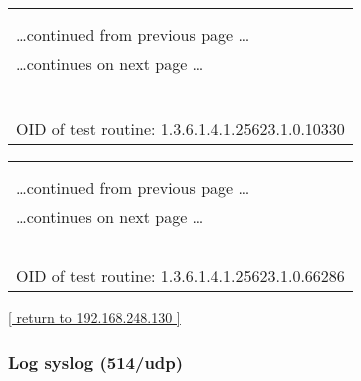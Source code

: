 \documentclass{article}
\begin{document}
\begin{longtable}{|p{}|}
\hline
\rowcolor{openvas_log}{\color{white}{Log (CVSS: 0.0) }}\\
\rowcolor{openvas_log}{\color{white}{NVT: Services}}\\
\hline
\endfirsthead
\hfill\ldots continued from previous page \ldots \\
\hline
\endhead
\hline
\ldots continues on next page \ldots \\
\endfoot
\hline
\endlastfoot
\\
\rowcolor{white}{\verb=An unknown service is running on this port.=}\\
\rowcolor{white}{\verb=It is usually reserved for AUTH=}\\
\rowcolor{white}{\verb==}\\
\rowcolor{white}{\verb==}\\
\\
OID of test routine: 1.3.6.1.4.1.25623.1.0.10330\\
\end{longtable}

\begin{longtable}{|p{}|}
\hline
\rowcolor{openvas_log}{\color{white}{Log (CVSS: 0.0) }}\\
\rowcolor{openvas_log}{\color{white}{NVT: Identify unknown services with nmap}}\\
\hline
\endfirsthead
\hfill\ldots continued from previous page \ldots \\
\hline
\endhead
\hline
\ldots continues on next page \ldots \\
\endfoot
\hline
\endlastfoot
\\
\rowcolor{white}{\verb=Nmap service detection result for this port: ident=}\\
\rowcolor{white}{\verb==}\\
\rowcolor{white}{\verb==}\\
\\
OID of test routine: 1.3.6.1.4.1.25623.1.0.66286\\
\end{longtable}

\begin{footnotesize}\hyperref[host:192.168.248.130]{[ return to 192.168.248.130 ]}\end{footnotesize}
\subsubsection{Log syslog (514/udp)}
\label{port:192.168.248.130 syslog (514/udp) Log}
\end{document}
